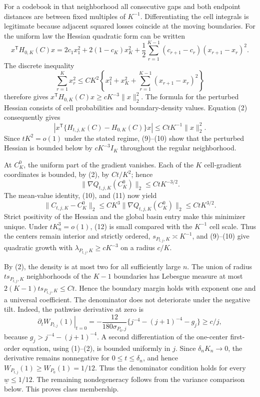 For a codebook in that neighborhood all consecutive gaps and both endpoint distances are between fixed multiples of \(K^{-1}\).  Differentiating the cell integrals is legitimate because adjacent squared losses coincide at the moving boundaries.  For the uniform law the Hessian quadratic form can be written
\[
 x^{\mathsf T}H_{0,K}(C)x
 =2c_1x_1^2+2(1-c_K)x_K^2
 +\frac12\sum_{r=1}^{K-1}(c_{r+1}-c_r)(x_{r+1}-x_r)^2. \tag{9}
\]
The discrete inequality
\[
 \sum_{r=1}^Kx_r^2\leq C K^2
 \left\{x_1^2+x_K^2+\sum_{r=1}^{K-1}(x_{r+1}-x_r)^2\right\}
\]
therefore gives \(x^{\mathsf T}H_{0,K}(C)x\geq cK^{-3}\|x\|_2^2\).  The formula for the perturbed Hessian consists of cell probabilities and boundary-density values.  Equation (2) consequently gives
\[
 |x^{\mathsf T}\{H_{t,j,K}(C)-H_{0,K}(C)\}x|
 \leq CtK^{-1}\|x\|_2^2. \tag{10}
\]
Since \(tK^2=o(1)\) under the stated regime, (9)--(10) show that the perturbed Hessian is bounded below by \(cK^{-3}I_K\) throughout the regular neighborhood.

At \(C_K^0\), the uniform part of the gradient vanishes.  Each of the \(K\) cell-gradient coordinates is bounded, by (2), by \(Ct/K^2\); hence
\[
 \|\nabla Q_{t,j,K}(C_K^0)\|_2\leq CtK^{-3/2}. \tag{11}
\]
The mean-value identity, (10), and (11) now yield
\[
 \|C_{t,j,K}-C_K^0\|_2
 \leq CK^3\|\nabla Q_{t,j,K}(C_K^0)\|_2
 \leq CtK^{3/2}. \tag{12}
\]
Strict positivity of the Hessian and the global basin entry make this minimizer unique.  Under \(tK_n^3=o(1)\), (12) is small compared with the \(K^{-1}\) cell scale.  Thus the centers remain interior and strictly ordered, \(s_{P_{t,j},K}\asymp K^{-1}\), and (9)--(10) give quadratic growth with \(\lambda_{P_{t,j},K}\geq cK^{-3}\) on a radius \(c/K\).

By (2), the density is at most two for all sufficiently large \(n\).  The union of radius \(ts_{P_{t,j},K}\) neighborhoods of the \(K-1\) boundaries has Lebesgue measure at most \(2(K-1)ts_{P_{t,j},K}\leq Ct\).  Hence the boundary margin holds with exponent one and a universal coefficient.  The denominator does not deteriorate under the negative tilt.  Indeed, the pathwise derivative at zero is
\[
 \left.\partial_tW_{P_{t,j}}(1)\right|_{t=0}
 =-\frac{12}{180\sigma_{P_0,j}}
 \{j^{-4}-(j+1)^{-4}-g_j\}\geq c/j,
\]
because \(g_j>j^{-4}-(j+1)^{-4}\).  A second differentiation of the one-center first-order equation, using (1)--(2), is bounded uniformly in \(j\).  Since \(\delta_nK_n\to0\), the derivative remains nonnegative for \(0\leq t\leq\delta_n\), and hence \(W_{P_{t,j}}(1)\geq W_{P_0}(1)=1/12\).  Thus the denominator condition holds for every \(\underline w\leq1/12\).  The remaining nondegeneracy follows from the variance comparison below.  This proves class membership.

